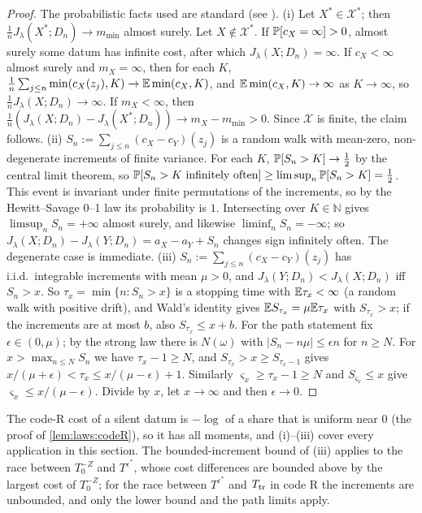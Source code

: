\begin{proof}
The probabilistic facts used are standard (see \citealp{durrett2019probability}). (i) Let $X^*\in\mathcal X^*$; then $\frac1nJ_\lambda(X^*;D_n)\to m_{\min}$ almost surely. Let $X\notin\mathcal X^*$. If $\mathbb{P}[c_X=\infty]>0$, almost surely some datum has infinite cost, after which $J_\lambda(X;D_n)=\infty$. If $c_X<\infty$ almost surely and $m_X=\infty$, then for each $K$, $\frac1n\sum_{j\le n}\min(c_X(z_j),K)\to\mathbb{E}\min(c_X,K)$, and $\mathbb{E}\min(c_X,K)\to\infty$ as $K\to\infty$, so $\frac1nJ_\lambda(X;D_n)\to\infty$. If $m_X<\infty$, then $\frac1n(J_\lambda(X;D_n)-J_\lambda(X^*;D_n))\to m_X-m_{\min}>0$. Since $\mathcal X$ is finite, the claim follows. (ii) $S_n:=\sum_{j\le n}(c_X-c_Y)(z_j)$ is a random walk with mean-zero, non-degenerate increments of finite variance. For each $K$, $\mathbb{P}[S_n>K]\to\frac12$ by the central limit theorem, so $\mathbb{P}[S_n>K\text{ infinitely often}]\ge\limsup_n\mathbb{P}[S_n>K]=\frac12$. This event is invariant under finite permutations of the increments, so by the Hewitt--Savage 0--1 law its probability is $1$. Intersecting over $K\in\mathbb N$ gives $\limsup_nS_n=+\infty$ almost surely, and likewise $\liminf_nS_n=-\infty$; so $J_\lambda(X;D_n)-J_\lambda(Y;D_n)=a_X-a_Y+S_n$ changes sign infinitely often. The degenerate case is immediate. (iii) $S_n:=\sum_{j\le n}(c_X-c_Y)(z_j)$ has i.i.d.\ integrable increments with mean $\mu>0$, and $J_\lambda(Y;D_n)<J_\lambda(X;D_n)$ iff $S_n>x$. So $\tau_x=\min\{n:S_n>x\}$ is a stopping time with $\mathbb{E}\tau_x<\infty$ (a random walk with positive drift), and Wald's identity gives $\mathbb{E} S_{\tau_x}=\mu\mathbb{E}\tau_x$ with $S_{\tau_x}>x$; if the increments are at most $b$, also $S_{\tau_x}\le x+b$. For the path statement fix $\epsilon\in(0,\mu)$; by the strong law there is $N(\omega)$ with $\lvert S_n-n\mu\rvert\le\epsilon n$ for $n\ge N$. For $x>\max_{n\le N}S_n$ we have $\tau_x-1\ge N$, and $S_{\tau_x}>x\ge S_{\tau_x-1}$ gives $x/(\mu+\epsilon)<\tau_x\le x/(\mu-\epsilon)+1$. Similarly $\varsigma_x\ge\tau_x-1\ge N$ and $S_{\varsigma_x}\le x$ give $\varsigma_x\le x/(\mu-\epsilon)$. Divide by $x$, let $x\to\infty$ and then $\epsilon\to0$.
\end{proof}

The code-R cost of a silent datum is $-\log$ of a share that is uniform near $0$ (the proof of \cref{lem:laws:codeR}), so it has all moments, and (i)--(iii) cover every application in this section. The bounded-increment bound of (iii) applies to the race between $T_0^{-Z}$ and $T^{\varepsilon^*}$, whose cost differences are bounded above by the largest cost of $T_0^{-Z}$; for the race between $T^{\varepsilon^*}$ and $T_{\rm tr}$ in code R the increments are unbounded, and only the lower bound and the path limits apply.

